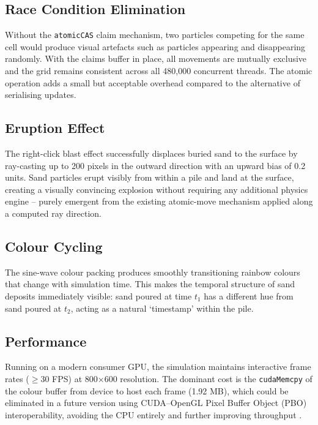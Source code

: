 \documentclass[12pt,a4paper]{article}
\begin{document}
	\subsection{Race Condition Elimination}
    Without the \texttt{atomicCAS} claim mechanism, two particles competing for the same cell 
    would produce visual artefacts such as particles appearing and disappearing randomly. With 
    the claims buffer in place, all movements are mutually exclusive and the grid remains 
    consistent across all 480,000 concurrent threads. The atomic operation adds a small but 
    acceptable overhead compared to the alternative of serialising updates.

	\subsection{Eruption Effect}
    The right-click blast effect successfully displaces buried sand to the surface by ray-casting 
    up to 200 pixels in the outward direction with an upward bias of 0.2 units. Sand particles 
    erupt visibly from within a pile and land at the surface, creating a visually convincing 
    explosion without requiring any additional physics engine -- purely emergent from the 
    existing atomic-move mechanism applied along a computed ray direction.

	\subsection{Colour Cycling}
    The sine-wave colour packing produces smoothly transitioning rainbow colours that change 
    with simulation time. This makes the temporal structure of sand deposits immediately visible: 
    sand poured at time $t_1$ has a different hue from sand poured at $t_2$, acting as a 
    natural \textquoteleft timestamp\textquoteright{} within the pile.

	\subsection{Performance}
    Running on a modern consumer GPU, the simulation maintains interactive frame rates 
    ($\geq$30 FPS) at 800$\times$600 resolution. The dominant cost is the \texttt{cudaMemcpy} 
    of the colour buffer from device to host each frame (1.92 MB), which could be eliminated 
    in a future version using CUDA--OpenGL Pixel Buffer Object (PBO) interoperability, 
    avoiding the CPU entirely and further improving throughput \cite{shreiner2013opengl}.
\end{document}
